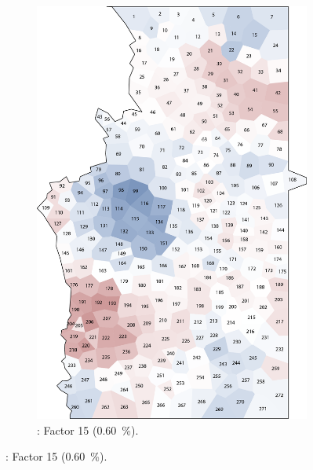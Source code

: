 \documentclass[output=paper]{LSP/langsci}
\begin{document}
\begin{figure}
\begin{subfigure}[t]{0.3\textwidth}
\includegraphics[width=\textwidth]{illustrations/pickl_fig17}
\caption{: Factor 15 (0.60~\%).}
\label{fig:17}
\end{subfigure}
\end{figure}
\end{document}
